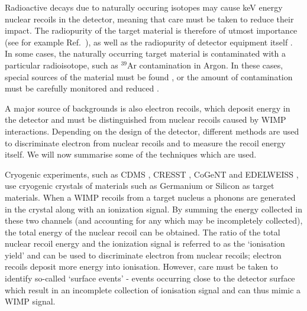 Radioactive decays due to naturally occuring isotopes may cause keV energy nuclear recoils in the detector, meaning that care must be taken to reduce their impact. The radiopurity of the target material is therefore of utmost importance (see for example Ref.~\cite{Munster:2014}), as well as the radiopurity of detector equipment itself \cite{Bernabei:2008b,Kuzniak:2012}. In some cases, the naturally occurring target material is contaminated with a particular radioisotope, such as $^{39}$Ar contamination in Argon. In these cases, special sources of the material must be found \cite{Galbiati:2008}, or the amount of contamination must be carefully monitored and reduced \cite{Abe:2009,Aprile:2013a}. 

A major source of backgrounds is also electron recoils, which deposit energy in the detector and must be distinguished from nuclear recoils caused by WIMP interactions. Depending on the design of the detector, different methods are used to discriminate electron from nuclear recoils and to measure the recoil energy itself. We will now summarise some of the techniques which are used.


Cryogenic experiments, such as CDMS \cite{Ahmed:2009,Ahmed:2011,Agnese:2013}, CRESST \cite{Angloher:2012}, CoGeNT \cite{Aalseth:2011a,Aalseth:2011b, Aalseth:2013,Aalseth:2014a,Aalseth:2014b} and EDELWEISS \cite{Armengaud:2011}, use cryogenic crystals of materials such as Germanium or Silicon as target materials. When a WIMP recoils from a target nucleus a phonons are generated in the crystal along with an ionization signal. By summing the energy collected in these two channels (and accounting for any which may be incompletely collected), the total energy of the nuclear recoil can be obtained. The ratio of the total nuclear recoil energy and the ionization signal is referred to as the `ionisation yield' and can be used to discriminate electron from nuclear recoils; electron recoils deposit more energy into ionisation. However, care must be taken to identify so-called `surface events' - events occurring close to the detector surface which result in an incomplete collection of ionisation signal and can thus mimic a WIMP signal.

